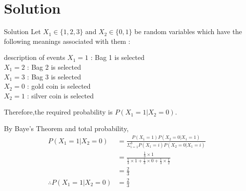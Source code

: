 \documentclass{beamer}
\providecommand{\brak}[1]{\ensuremath{\left(#1\right)}}
\begin{document}
\section{Solution}
\begin{frame}{Solution}
    Let $X_{1} \in \lbrace 1,2,3 \rbrace$ and $X_{2} \in \lbrace 0,1 \rbrace$ be random variables which have the following meanings associated with them :\\
\begin{block}{description of events}
$X_{1} = 1$ : Bag 1 is selected\\
$X_{1} = 2$ : Bag 2 is selected\\
$X_{1} = 3$ : Bag 3 is selected\\
$X_{2} = 0$ : gold coin is selected\\
$X_{2} = 1$ : silver coin is selected\\

\end{block}
Therefore,the required probability is $P\brak{X_{1}=1|X_{2}=0}$.\\

\end{frame}
 \begin{frame}
 By Baye's Theorem and total probability,\\


\begin{align}
P\brak{X_{1}=1|X_{2}=0}&= \frac{P\brak{X_{1}=1} P\brak{X_{2}=0|X_{1}=1}}{\Sigma^{3}_{i=1} P\brak{X_{1}=i}P\brak{X_{2}=0|X_{1}=i}}\\
&= \frac{\frac{1}{3} \times 1}{\frac{1}{3} \times 1 + \frac{1}{3} \times 0 + \frac{1}{3} \times \frac{1}{2} }\\
&= \frac{2}{3}\\
\therefore P\brak{X_{1}=1|X_{2}=0} &= \frac{2}{3}
\end{align}

 \end{frame}
 
\end{document}
